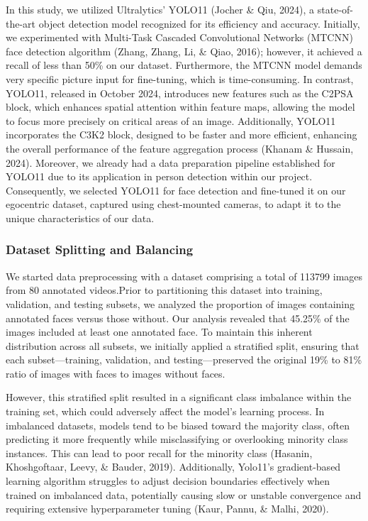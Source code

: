 \documentclass[
  man,floatsintext]{apa6}
\begin{document}
In this study, we utilized Ultralytics' YOLO11 (Jocher \& Qiu, 2024), a state-of-the-art object detection model recognized for its efficiency and accuracy. Initially, we experimented with Multi-Task Cascaded Convolutional Networks (MTCNN) face detection algorithm (Zhang, Zhang, Li, \& Qiao, 2016); however, it achieved a recall of less than 50\% on our dataset. Furthermore, the MTCNN model demands very specific picture input for fine-tuning, which is time-consuming. In contrast, YOLO11, released in October 2024, introduces new features such as the C2PSA block, which enhances spatial attention within feature maps, allowing the model to focus more precisely on critical areas of an image. Additionally, YOLO11 incorporates the C3K2 block, designed to be faster and more efficient, enhancing the overall performance of the feature aggregation process (Khanam \& Hussain, 2024). Moreover, we already had a data preparation pipeline established for YOLO11 due to its application in person detection within our project. Consequently, we selected YOLO11 for face detection and fine-tuned it on our egocentric dataset, captured using chest-mounted cameras, to adapt it to the unique characteristics of our data.

\subsubsection{Dataset Splitting and Balancing}\label{dataset-splitting-and-balancing}

We started data preprocessing with a dataset comprising a total of 113799 images from 80 annotated videos.Prior to partitioning this dataset into training, validation, and testing subsets, we analyzed the proportion of images containing annotated faces versus those without. Our analysis revealed that 45.25\% of the images included at least one annotated face. To maintain this inherent distribution across all subsets, we initially applied a stratified split, ensuring that each subset---training, validation, and testing---preserved the original 19\% to 81\% ratio of images with faces to images without faces.

However, this stratified split resulted in a significant class imbalance within the training set, which could adversely affect the model's learning process. In imbalanced datasets, models tend to be biased toward the majority class, often predicting it more frequently while misclassifying or overlooking minority class instances. This can lead to poor recall for the minority class (Hasanin, Khoshgoftaar, Leevy, \& Bauder, 2019). Additionally, Yolo11's gradient-based learning algorithm struggles to adjust decision boundaries effectively when trained on imbalanced data, potentially causing slow or unstable convergence and requiring extensive hyperparameter tuning (Kaur, Pannu, \& Malhi, 2020).
\end{document}
